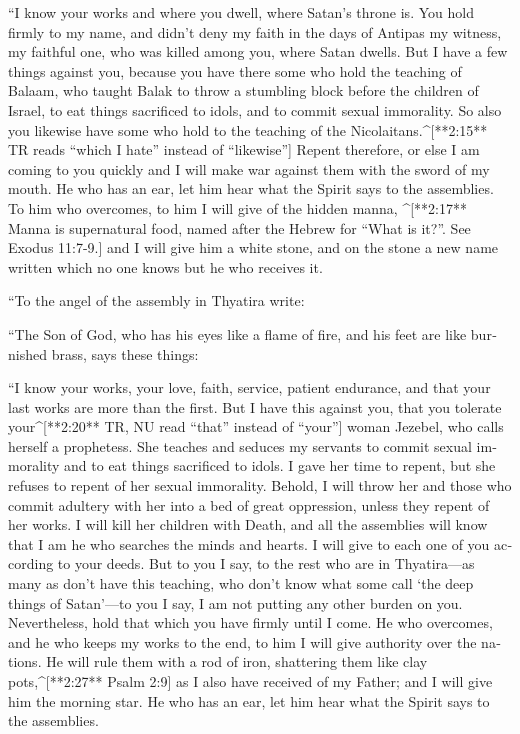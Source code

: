 \begin{paracols}{2}
\begin{english}
 “I know your works and where you dwell, where Satan’s throne is. You hold firmly to my name, and didn’t deny my faith in the days of Antipas my witness, my faithful one, who was killed among you, where Satan dwells.  But I have a few things against you, because you have there some who hold the teaching of Balaam, who taught Balak to throw a stumbling block before the children of Israel, to eat things sacrificed to idols, and to commit sexual immorality.  So also you likewise have some who hold to the teaching of the Nicolaitans.^[**2:15** TR reads “which I hate” instead of “likewise”]  Repent therefore, or else I am coming to you quickly and I will make war against them with the sword of my mouth.  He who has an ear, let him hear what the Spirit says to the assemblies. To him who overcomes, to him I will give of the hidden manna, ^[**2:17** Manna is supernatural food, named after the Hebrew for “What is it?”. See Exodus 11:7-9.] and I will give him a white stone, and on the stone a new name written which no one knows but he who receives it. 

 “To the angel of the assembly in Thyatira write: 

“The Son of God, who has his eyes like a flame of fire, and his feet are like burnished brass, says these things: 

 “I know your works, your love, faith, service, patient endurance, and that your last works are more than the first.  But I have this against you, that you tolerate your^[**2:20** TR, NU read “that” instead of “your”] woman Jezebel, who calls herself a prophetess. She teaches and seduces my servants to commit sexual immorality and to eat things sacrificed to idols.  I gave her time to repent, but she refuses to repent of her sexual immorality.  Behold, I will throw her and those who commit adultery with her into a bed of great oppression, unless they repent of her works.  I will kill her children with Death, and all the assemblies will know that I am he who searches the minds and hearts. I will give to each one of you according to your deeds.  But to you I say, to the rest who are in Thyatira—as many as don’t have this teaching, who don’t know what some call ‘the deep things of Satan’—to you I say, I am not putting any other burden on you.  Nevertheless, hold that which you have firmly until I come.  He who overcomes, and he who keeps my works to the end, to him I will give authority over the nations.  He will rule them with a rod of iron, shattering them like clay pots,^[**2:27** Psalm 2:9] as I also have received of my Father;  and I will give him the morning star.  He who has an ear, let him hear what the Spirit says to the assemblies.


\end{english}
\end{paracols}
